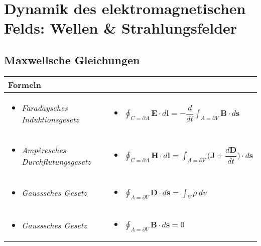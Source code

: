\section{Dynamik des elektromagnetischen Felds: Wellen \& Strahlungsfelder}
\subsection{Maxwellsche Gleichungen}


\begin{tabular}{| m{7cm} m{11cm} |}
	\hline
	Formeln &  \\ \hline
	\hline 
	\begin{itemize}
		\item \textit{Faradaysches Induktionsgesetz}
	\end{itemize}
	& 
	\begin{itemize}
		\item[] $\displaystyle\oint_{C=\partial A}\mathbf{E}\cdot d\mathbf{l}=-\dfrac{d}{dt}\displaystyle\int_{A=\partial V}\mathbf{B}\cdot d\mathbf{s}$
	\end{itemize}

	\\ 	
	\begin{itemize}
		\item \textit{Ampèresches Durchflutungsgesetz } 
	\end{itemize} 
	&
	\begin{itemize}
		\item[] $\displaystyle\oint_{C=\partial A}\mathbf{H}\cdot d\mathbf{l}=\displaystyle\int_{A=\partial V}\big(\mathbf{J}+\dfrac{d\mathbf{D}}{dt}\big)\cdot d\mathbf{s}$ 
	\end{itemize}
  \\ 
	\begin{itemize}
		\item \textit{Gausssches Gesetz}
	\end{itemize} 
	&  
	\begin{itemize}
		\item[] $\displaystyle\oint_{A=\partial V}\mathbf{D}\cdot d\mathbf{s}=\displaystyle\int_{V}\rho\ dv
		$ 
	\end{itemize}
  \\ 
	\begin{itemize}
		\item \textit{Gausssches Gesetz}
	\end{itemize} 
	& 
	\begin{itemize}
		\item[] $\displaystyle\oint_{A=\partial V}\mathbf{B}\cdot d\mathbf{s}=0$ 
	\end{itemize}
  \\ 
	\hline 
\end{tabular} 

